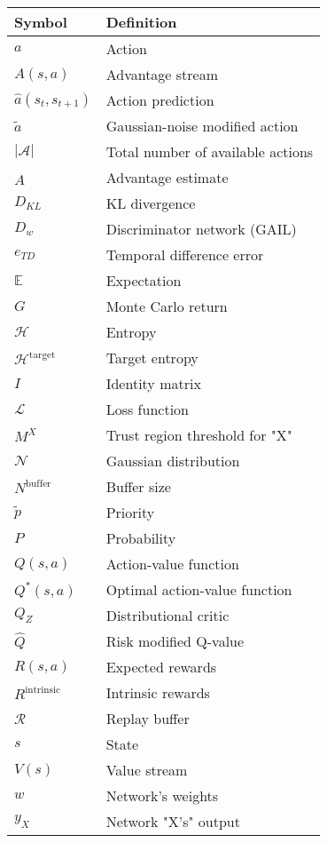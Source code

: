 \begin{longtable}{p{2.5cm}p{12cm}}
    \toprule
    Symbol & Definition \\
    \midrule\endhead
    $a$ & Action \\
    $A(s, a)$ & Advantage stream \\
    $\hat{a}(s_t, s_{t+1})$ & Action prediction \\
    $\tilde{a}$ & Gaussian-noise modified action \\
    $|\mathcal{A}|$ & Total number of available actions \\
    $\hat{A}$ & Advantage estimate \\
    $D_{KL}$ & KL divergence  \\
    $D_w$ & Discriminator network (GAIL)\\
    $e_{TD}$ & Temporal difference error \\
    $\mathbb{E}$ & Expectation \\
    $G$ & Monte Carlo return \\
    $\mathcal{H}$ & Entropy \\
    $\mathcal{H}^{\text{target}}$ & Target entropy \\
    $I$ & Identity matrix \\
    $\mathcal{L}$ & Loss function \\
    $M^X$ & Trust region threshold for "X" \\
    $\mathcal{N}$ & Gaussian distribution \\
    $N^{\text{buffer}}$ & Buffer size \\
    $\tilde{p}$ & Priority \\
    $P$ & Probability \\
    $Q(s,a)$ & Action-value function \\
    $Q^{*}(s,a)$ & Optimal action-value function \\
    $Q_Z$ & Distributional critic \\
    $\hat{Q}$ & Risk modified Q-value \\
    $R(s, a)$ & Expected rewards \\
    $R^{\text{intrinsic}}$ & Intrinsic rewards \\
    $\mathcal{R}$ & Replay buffer \\
    $s$ & State \\
    $V(s)$ & Value stream \\
    $w$ & Network's weights \\
    $y_{X}$ & Network "X's" output \\
    

\end{longtable}
